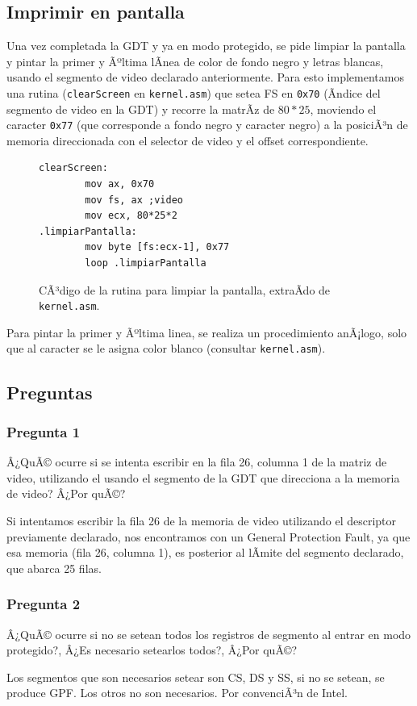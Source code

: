 \documentclass[10pt, a4paper]{article}
\begin{document}
\subsection{Imprimir en pantalla}
Una vez completada la GDT y ya en modo protegido, se pide limpiar la pantalla y pintar la primer y Ãºltima lÃ­nea de color de fondo negro y letras blancas, usando
el segmento de video declarado anteriormente.
Para esto implementamos una rutina (\texttt{clearScreen} en \texttt{kernel.asm}) que setea FS en \texttt{0x70} (Ã­ndice del segmento de video en la GDT) y recorre
la matrÃ­z de $80*25$, moviendo el caracter \texttt{0x77} (que corresponde a fondo negro y caracter negro) a la posiciÃ³n de memoria direccionada con el selector de video 
y el offset correspondiente.

\begin{figure}[!h]
\begin{center}
\begin{verbatim}
clearScreen:		
		mov ax, 0x70
		mov fs, ax ;video
		mov ecx, 80*25*2
.limpiarPantalla:
		mov byte [fs:ecx-1], 0x77
		loop .limpiarPantalla
\end{verbatim}
\caption{CÃ³digo de la rutina para limpiar la pantalla, extraÃ­do de \texttt{kernel.asm}.}
\end{center}
\end{figure}
Para pintar la primer y Ãºltima linea, se realiza un procedimiento anÃ¡logo, solo que al caracter se le asigna color blanco (consultar \texttt{kernel.asm}). 
		
\subsection{Preguntas}
\subsubsection*{Pregunta 1}
 \begin{framed}
Â¿QuÃ© ocurre si se intenta escribir en la fila 26, columna 1 de la matriz de video, utilizando el usando el segmento de la GDT que direcciona a la memoria de video?
Â¿Por quÃ©?
\end{framed}
Si intentamos escribir la fila 26 de la memoria de video utilizando el descriptor previamente declarado, nos encontramos con un General Protection Fault, ya que esa memoria (fila 26, columna 1), es posterior al lÃ­mite del segmento declarado, que abarca 25 filas.
\subsubsection*{Pregunta 2}
 \begin{framed}
Â¿QuÃ© ocurre si no se setean todos los registros de segmento al entrar en modo protegido?, Â¿Es necesario setearlos todos?, Â¿Por quÃ©?
\end{framed}
Los segmentos que son necesarios setear son CS, DS y SS, si no se setean, se produce GPF. Los otros no son necesarios. Por convenciÃ³n de Intel. %
\end{document}
